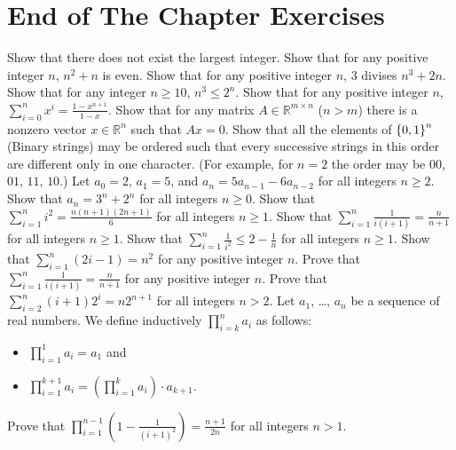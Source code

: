 \section*{End of The Chapter Exercises}
\begin{exercises}
  \exerciseitem Show that there does not exist the largest integer.
  \exerciseitem Show that for any positive integer $n$, $n^2 + n$ is even.
  \exerciseitem Show that for any positive integer $n$, $3$ divises
    $n^3 + 2n$.
  \exerciseitem Show that for any integer $n \ge 10$,
    $n^3 \le 2^n$.
  \exerciseitem Show that for any positive integer $n$,
    $\sum_{i = 0}^n x^i = \frac{1 - x^{n + 1}}{1 - x}$.
  \exerciseitem Show that for any matrix $A \in \mathbb{R}^{m \times n}$
    ($n > m$) there is a nonzero vector $x \in \mathbb{R}^n$ such that $Ax = 0$.
  \exerciseitem  Show that all the elements of $\set{0, 1}^n$ (Binary strings)
    may be ordered such that every successive strings in this order are
    different only in one character.
    (For example, for $n = 2$ the order may be $00$, $01$, $11$, $10$.)
  \exerciseitem Let $a_0 = 2$, $a_1 = 5$, and $a_n = 5a_{n - 1} - 6 a_{n - 2}$
    for all integers $n \ge 2$. Show that $a_n = 3^n + 2^n$ for all integers
    $n \ge 0$.
  \exerciseitem Show that $\sum_{i = 1}^n i^2 = \frac{n (n + 1)(2n + 1)}{6}$
    for all integers $n \ge 1$.
  \exerciseitem Show that $\sum\limits_{i = 1}^n \frac{1}{i (i + 1)} =
    \frac{n}{n + 1}$ for all integers $n \ge 1$.
  \exerciseitem Show that $\sum\limits_{i = 1}^n \frac{1}{i^2} \le
    2 - \frac{1}{n}$ for all integers $n \ge 1$.
  \exerciseitem Show that $\sum_{i = 1}^n (2i - 1) = n^2$ for any positive
    integer $n$.
  \exerciseitem Prove that $\sum_{i = 1}^n \frac{1}{i (i + 1)} =
    \frac{n}{n + 1}$ for any positive integer $n$.
  \exerciseitem Prove that $\sum\limits_{i = 2}^n (i + 1) 2^i = n 2^{n + 1}$
    for all integers $n > 2$.
  \exerciseitem Let $a_1$, \dots, $a_n$ be a sequence of real numbers.
    We define inductively
    $\prod_{i = k}^n a_i$ as follows:
    \begin{itemize}
      \item $\prod_{i = 1}^1 a_i = a_1$ and
      \item $\prod_{i = 1}^{k + 1} a_i =
        \left( \prod_{i = 1}^k a_i \right) \cdot a_{k + 1}$.
      \end{itemize}

      Prove that $\prod_{i = 1}^{n - 1} \left(1 - \frac{1}{(i + 1)^2} \right) =
      \frac{n + 1}{2n}$ for all integers $n > 1$.


\end{exercises}
